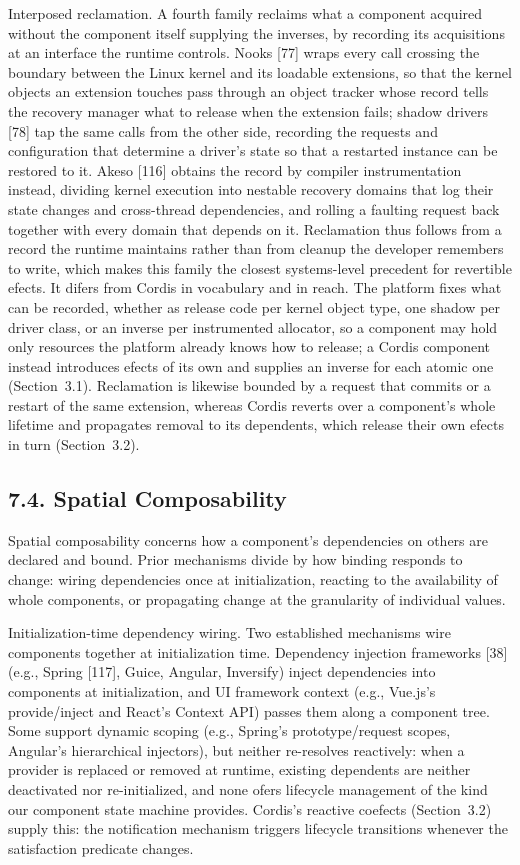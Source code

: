 \documentclass[
  10
]{article}
\newcounter{none} %
\begin{document}
Interposed reclamation. A fourth family reclaims what a component
acquired without the component itself supplying the inverses, by
recording its acquisitions at an interface the runtime controls. Nooks
{[}77{]} wraps every call crossing the boundary between the Linux kernel
and its loadable extensions, so that the kernel objects an extension
touches pass through an object tracker whose record tells the recovery
manager what to release when the extension fails; shadow drivers
{[}78{]} tap the same calls from the other side, recording the requests
and configuration that determine a driver's state so that a restarted
instance can be restored to it. Akeso {[}116{]} obtains the record by
compiler instrumentation instead, dividing kernel execution into
nestable recovery domains that log their state changes and cross-thread
dependencies, and rolling a faulting request back together with every
domain that depends on it. Reclamation thus follows from a record the
runtime maintains rather than from cleanup the developer remembers to
write, which makes this family the closest systems-level precedent for
revertible efects. It difers from Cordis in vocabulary and in reach. The
platform fixes what can be recorded, whether as release code per kernel
object type, one shadow per driver class, or an inverse per instrumented
allocator, so a component may hold only resources the platform already
knows how to release; a Cordis component instead introduces efects of
its own and supplies an inverse for each atomic one (Section~3.1).
Reclamation is likewise bounded by a request that commits or a restart
of the same extension, whereas Cordis reverts over a component's whole
lifetime and propagates removal to its dependents, which release their
own efects in turn (Section~3.2).

\subsection{7.4. Spatial Composability}\label{spatial-composability-1}

Spatial composability concerns how a component's dependencies on others
are declared and bound. Prior mechanisms divide by how binding responds
to change: wiring dependencies once at initialization, reacting to the
availability of whole components, or propagating change at the
granularity of individual values.

Initialization-time dependency wiring. Two established mechanisms wire
components together at initialization time. Dependency injection
frameworks {[}38{]} (e.g., Spring {[}117{]}, Guice, Angular, Inversify)
inject dependencies into components at initialization, and UI framework
context (e.g., Vue.js's provide/inject and React's Context API) passes
them along a component tree. Some support dynamic scoping (e.g.,
Spring's prototype/request scopes, Angular's hierarchical injectors),
but neither re-resolves reactively: when a provider is replaced or
removed at runtime, existing dependents are neither deactivated nor
re-initialized, and none ofers lifecycle management of the kind our
component state machine provides. Cordis's reactive coefects
(Section~3.2) supply this: the notification mechanism triggers lifecycle
transitions whenever the satisfaction predicate changes.
\end{document}
